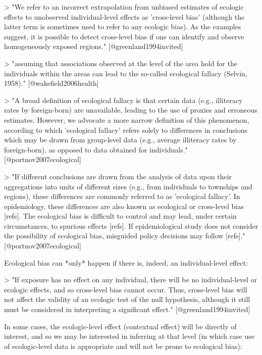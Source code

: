 > "We refer to an incorrect extrapolation from unbiased estimates of ecologic
effects to unobserved individual-level effects as 'cross-level bias' (although
the latter term is sometimes used to refer to any ecologic bias). As the
examples suggest, it is possible to detect cross-level bias if one can identify
and observe homogeneously exposed regions." [@greenland1994invited]

> "assuming that associations observed at the level of the area hold for the 
individuals within the areas can lead to the so-called ecological fallacy 
(Selvin, 1958)." [@wakefield2006health]

> "A broad definition of ecological fallacy is that certain data (e.g.,
illiteracy rates by foreign-born) are unavailable, leading to the use of proxies
and erroneous estimates. However, we advocate a more narrow definition of this
phenomenon, according to which 'ecological fallacy' refers solely to differences
in conclusions which may be drawn from group-level data (e.g., average
illiteracy rates by foreign-born), as opposed to data obtained for individuals."
[@portnov2007ecological]

> "If different conclusions are drawn from the analysis of data upon their
aggregations into units of different sizes (e.g., from individuals to townships
and regions), these differences are commonly referred to as 'ecological
fallacy'. In epidemiology, these differences are also known as ecological or
cross-level bias [refs]. The ecological bias is difficult to control and may
lead, under certain circumstances, to spurious effects [refs]. If
epidemiological study does not consider the possibility of ecological bias,
misguided policy decisions may follow [refs]." [@portnov2007ecological]

Ecological bias can *only* happen if there is, indeed, an individual-level
effect:

> "If exposure has no effect on any individual, there will be
no individual-level or ecologic effects, and so cross-level bias cannot occur. 
Thus, cross-level bias will not affect the validity of an ecologic test of the 
null hypothesis, although it still must be considered in interpreting a 
significant effect." [@greenland1994invited]

In some cases, the ecologic-level effect (contextual effect) will be directly 
of interest, and so we may be interested in inferring at that level (in which 
case use of ecologic-level data is appropriate and will not be prone to 
ecological bias):

